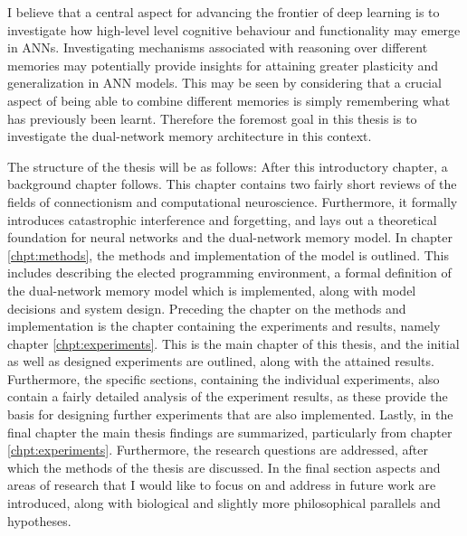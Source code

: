 I believe that a central aspect for advancing the frontier of deep learning is to investigate how high-level level cognitive behaviour and functionality may emerge in ANNs. Investigating mechanisms associated with reasoning over different memories may potentially provide insights for attaining greater plasticity and generalization in ANN models. This may be seen by considering that a crucial aspect of being able to combine different memories is simply remembering what has previously been learnt. 
Therefore the foremost goal in this thesis is to investigate the dual-network memory architecture in this context.

The structure of the thesis will be as follows: After this introductory chapter, a background chapter follows. This chapter contains two fairly short reviews of the fields of connectionism and computational neuroscience. Furthermore, it formally introduces catastrophic interference and forgetting, and lays out a theoretical foundation for neural networks and the dual-network memory model. 
In chapter \ref{chpt:methods}, the methods and implementation of the model is outlined. This includes describing the elected programming environment, a formal definition of the dual-network memory model which is implemented, along with model decisions and system design.
Preceding the chapter on the methods and implementation is the chapter containing the experiments and results, namely chapter \ref{chpt:experiments}.
This is the main chapter of this thesis, and the initial as well as designed experiments are outlined, along with the attained results. Furthermore, the specific sections, containing the individual experiments, also contain a fairly detailed analysis of the experiment results, as these provide the basis for designing further experiments that are also implemented.
Lastly, in the final chapter the main thesis findings are summarized, particularly from chapter \ref{chpt:experiments}. Furthermore, the research questions are addressed, after which the methods of the thesis are discussed. In the final section aspects and areas of research that I would like to focus on and address in future work are introduced, along with biological and slightly more philosophical parallels and hypotheses.




